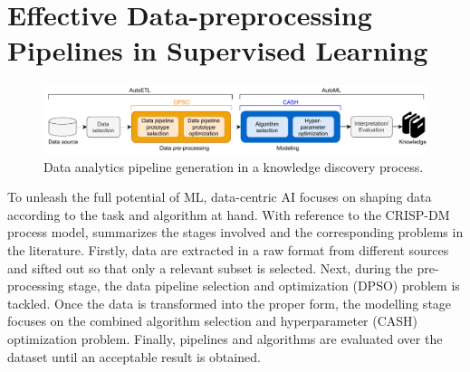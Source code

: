 
\chapter{Effective Data-preprocessing Pipelines in Supervised Learning}
\label{data-centric-chap:supervised}

\begin{figure}[t]
    \centering
    \includegraphics[width=1.0\textwidth]{chapters/data-centric/supervised/img/data-analytics-pipeline.pdf}
    \caption{Data analytics pipeline generation in a knowledge discovery process.}
    \label{fig:data-analytics-pipeline}
\end{figure}

To unleash the full potential of ML, data-centric AI focuses on shaping data according to the task and algorithm at hand.
With reference to the CRISP-DM process model,   summarizes the stages involved and the corresponding problems in the literature.
Firstly, data are extracted in a raw format from different sources and sifted out so that only a relevant subset is selected.
Next, during the pre-processing stage, the data pipeline selection and optimization (DPSO) \cite{Quemy19DOLAP} problem is tackled.
Once the data is transformed into the proper form, the modelling stage focuses on the combined algorithm selection and hyperparameter (CASH) optimization problem.
Finally, pipelines and algorithms
are evaluated over the dataset until an acceptable result is obtained.




